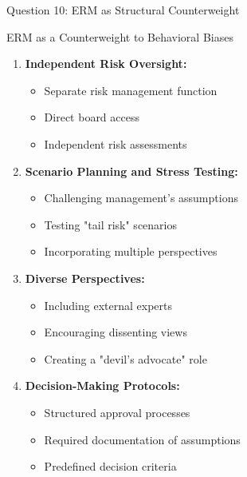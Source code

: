 \documentclass[aspectratio=169]{beamer}
\begin{document}
	\begin{frame}{Question 10: ERM as Structural Counterweight}
		
		\begin{block}{ERM as a Counterweight to Behavioral Biases}
			
			\begin{enumerate}
				\item \textbf{Independent Risk Oversight:}
				\begin{itemize}
					\item Separate risk management function
					\item Direct board access
					\item Independent risk assessments
				\end{itemize}
				
				\item \textbf{Scenario Planning and Stress Testing:}
				\begin{itemize}
					\item Challenging management's assumptions
					\item Testing "tail risk" scenarios
					\item Incorporating multiple perspectives
				\end{itemize}
				
				\item \textbf{Diverse Perspectives:}
				\begin{itemize}
					\item Including external experts
					\item Encouraging dissenting views
					\item Creating a "devil's advocate" role
				\end{itemize}
				
				\item \textbf{Decision-Making Protocols:}
				\begin{itemize}
					\item Structured approval processes
					\item Required documentation of assumptions
					\item Predefined decision criteria
				\end{itemize}
			\end{enumerate}
		\end{block}
	\end{frame}
	
\end{document}
